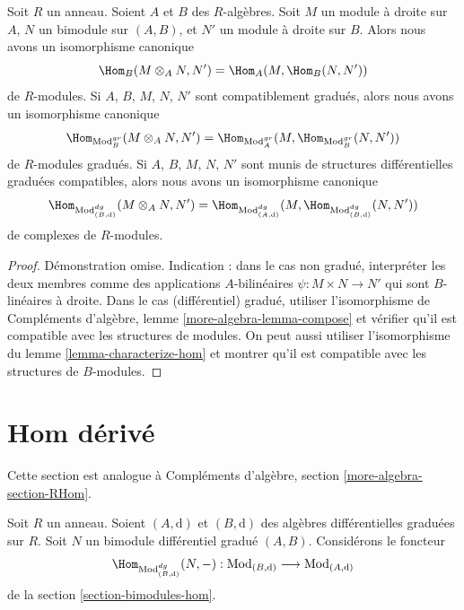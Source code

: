 \begin{lemma}
\label{lemma-tensor-hom-adjunction}
Soit $R$ un anneau. Soient $A$ et $B$ des $R$-algèbres.
Soit $M$ un module à droite sur $A$, $N$ un bimodule sur $(A, B)$, et $N'$
un module à droite sur $B$. Alors nous avons un isomorphisme canonique
$$
\Hom_B(M \otimes_A N, N') = \Hom_A(M, \Hom_B(N, N'))
$$
de $R$-modules.
Si $A$, $B$, $M$, $N$, $N'$ sont compatiblement gradués, alors nous avons un
isomorphisme canonique
$$
\Hom_{\text{Mod}_B^{gr}}(M \otimes_A N, N') =
\Hom_{\text{Mod}_A^{gr}}(M, \Hom_{\text{Mod}_B^{gr}}(N, N'))
$$
de $R$-modules gradués. Si
$A$, $B$, $M$, $N$, $N'$ sont munis de structures différentielles graduées compatibles,
alors nous avons un isomorphisme canonique
$$
\Hom_{\text{Mod}^{dg}_{(B, \text{d})}}(M \otimes_A N, N') =
\Hom_{\text{Mod}^{dg}_{(A, \text{d})}}(M,
\Hom_{\text{Mod}^{dg}_{(B, \text{d})}}(N, N'))
$$
de complexes de $R$-modules.
\end{lemma}

\begin{proof}
Démonstration omise. Indication : dans le cas non gradué, interpréter les deux membres
comme des applications $A$-bilinéaires $\psi : M \times N \to N'$ qui sont
$B$-linéaires à droite. Dans le cas (différentiel) gradué, utiliser
l'isomorphisme de Compléments d'algèbre, lemme
\ref{more-algebra-lemma-compose} et vérifier qu'il est compatible avec les structures
de modules. On peut aussi utiliser l'isomorphisme du lemme
\ref{lemma-characterize-hom} et montrer qu'il est compatible avec les structures de $B$-modules.
\end{proof}







\section{Hom dérivé}
\label{section-restriction}

\noindent
Cette section est analogue à
Compléments d'algèbre, section \ref{more-algebra-section-RHom}.

\medskip\noindent
Soit $R$ un anneau. Soient $(A, \text{d})$ et $(B, \text{d})$
des algèbres différentielles graduées sur $R$. Soit $N$ un
bimodule différentiel gradué $(A, B)$. Considérons le foncteur
\begin{equation}
\label{equation-restriction}
\Hom_{\text{Mod}^{dg}_{(B, \text{d})}}(N, -) :
\text{Mod}_{(B, \text{d})}
\longrightarrow
\text{Mod}_{(A, \text{d})}
\end{equation}
de la section \ref{section-bimodules-hom}.

